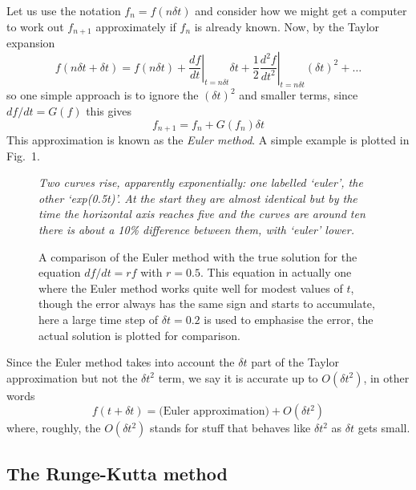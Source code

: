 \documentclass[12pt]{article}
\begin{document}
Let us use the notation $f_n=f(n\delta t)$ and consider how we might
get a computer to work out $f_{n+1}$ approximately if $f_n$ is already
known. Now, by the Taylor expansion
\begin{equation}
f(n\delta t+\delta t)=f(n\delta
t)+\left.\frac{df}{dt}\right|_{t=n\delta t}\delta
t+\frac{1}{2}\left.\frac{d^2f}{dt^2}\right|_{t=n\delta t}(\delta t)^2+\ldots
\end{equation}
so one simple approach is to ignore the $(\delta t)^2$ and smaller terms, since $df/dt=G(f)$ this gives
\begin{equation}
f_{n+1}=f_n+G(f_n)\delta t
\end{equation}
This approximation is known as the \textsl{Euler method}. A simple example is plotted in Fig.~1. 

\begin{figure}
{\textsl{Two curves rise, apparently exponentially: one labelled `euler', the other `exp(0.5t)'. At the start they are almost identical but by the time the horizontal axis reaches five and the curves are around ten there is about a 10\% difference between them, with `euler' lower.}}
{
 \begin{center}

 \end{center}
 }
\caption{A comparison of the Euler method with the true solution for
  the equation $df/dt=rf$ with $r=0.5$. This equation in actually one
  where the Euler method works quite well for modest values of $t$,
  though the error always has the same sign and starts to accumulate,
  here a large time step of $\delta t=0.2$ is used to emphasise the
  error, the actual solution is plotted for comparison.}
\end{figure}

Since the Euler method takes into account the $\delta t$ part of the
Taylor approximation but not the $\delta t^2$ term, we say it is
accurate up to $O(\delta t^2)$, in other words
\begin{equation}
  f(t+\delta t)=\mbox{(Euler approximation)}+O(\delta t^2)
\end{equation}
where, roughly, the $O(\delta t^2)$ stands for stuff that behaves like
$\delta t^2$ as $\delta t$ gets small.


\subsection*{The Runge-Kutta method}
\end{document}
